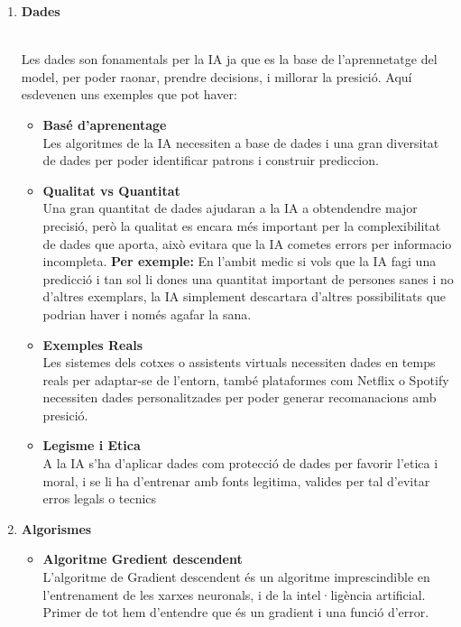 \begin{enumerate}
    \item \hypertarget{Dades}{\textbf{Dades}}\\
    Les dades son fonamentals per la IA ja que es la base de l'aprennetatge del model, per poder raonar, prendre decisions, i millorar la presició. Aquí esdevenen uns exemples que pot haver:
         \begin{itemize}
            \item[] \textbf{Basé d'aprenentage}\\
            Les algoritmes de la IA necessiten a base de dades i una gran diversitat de dades per poder identificar patrons i construir prediccion.

           \item[] \textbf{Qualitat vs Quantitat}\\
            Una gran quantitat de dades ajudaran a la IA a obtendendre major precisió, però la qualitat es encara més important per la complexibilitat de dades que aporta, això evitara que la IA cometes errors per informacio incompleta.\textbf{ Per exemple:} En l'ambit medic si vols que la IA fagi una predicció i tan sol li dones una quantitat important de persones sanes i no d'altres exemplars, la IA simplement descartara d'altres possibilitats que podrian haver i només agafar la sana.

            \item[] \textbf{Exemples Reals}\\
            Les sistemes dels cotxes o assistents virtuals necessiten dades en temps reals per adaptar-se de l'entorn, també plataformes com Netflix o Spotify necessiten dades personalitzades per poder generar recomanacions amb presició.

           \item[] \textbf{Legisme i Etica}\\
            A la IA s'ha d'aplicar dades com protecció de dades per favorir l'etica i moral, i se li ha d'entrenar amb fonts legitima, valides per tal d'evitar erros legals o tecnics
          \end{itemize}

     \item \hypertarget{Algorismes}{\textbf{Algorismes}}
        \begin{itemize}
         \item[] \textbf{Algoritme Gredient descendent}\\
         L'algoritme de Gradient descendent és un algoritme imprescindible en l'entrenament de les xarxes neuronals, i de la intel·ligència artificial. Primer de tot hem d'entendre que és un gradient i una funció d'error.


\end{itemize}
\end{enumerate}
